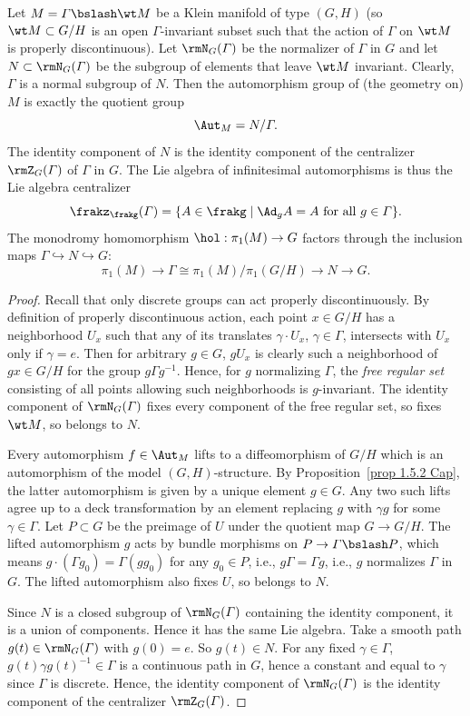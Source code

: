 \begin{thm}
    Let $M=\varGamma\bslash \wt M$ be a Klein manifold of type $(G,H)$ (so $\wt M\subset G\slash H$ is an open $\varGamma$-invariant subset such that the action of $\varGamma$ on $\wt M$ is properly discontinuous). Let $\rmN_G(\varGamma)$ be the normalizer of $\varGamma$ in $G$ and let $N\subset \rmN_G(\varGamma)$ be the subgroup of elements that leave $\wt M$ invariant. Clearly, $\varGamma$ is a normal subgroup of $N$. Then the automorphism group of (the geometry on) $M$ is exactly the quotient group
    \[\Aut_M=N\slash \varGamma.\]
    The identity component of $N$ is the identity component of the centralizer $\rmZ_G(\varGamma)$ of $\varGamma$ in $G$. The Lie algebra of infinitesimal automorphisms is thus the Lie algebra centralizer 
    \[\frakz_\frakg(\varGamma)=\{A\in\frakg\mid \Ad_g A=A\text{ for all }g\in\varGamma\}.\]
    The monodromy homomorphism $\hol:\pi_1(M)\to G$ factors through the inclusion maps $\varGamma\hookrightarrow N\hookrightarrow G$:
    \[\pi_1(M)\to \varGamma\cong \pi_1(M)\slash \pi_1(G\slash H)\to N\to G.\] 
\end{thm}
\begin{proof}
    Recall that only discrete groups can act properly discontinuously. By definition of properly discontinuous action, each point $x\in G\slash H$ has a neighborhood $U_x$ such that any of its translates $\gamma\cdot U_x$, $\gamma\in\varGamma$, intersects with $U_x$ only if $\gamma=e$. Then for arbitrary $g\in G$, $gU_x$ is clearly such a neighborhood of $gx\in G\slash H$ for the group $g\varGamma g^{-1}$. Hence, for $g$ normalizing $\varGamma$, the \emph{free regular set}  consisting of all points allowing such neighborhoods is $g$-invariant. The identity component of $\rmN_G(\varGamma)$ fixes every component of the free regular set, so fixes $\wt M$, so belongs to $N$. 

    Every automorphism $f\in \Aut_M$ lifts to a diffeomorphism of $G\slash H$ which is an automorphism of the model $(G,H)$-structure. By Proposition~\ref{prop 1.5.2 Cap}, the latter automorphism is given by a unique element $g\in G$. Any two such lifts agree up to a deck transformation by an element replacing $g$ with $\gamma g$ for some $\gamma\in\varGamma$. Let $P\subset G$ be the preimage of $U$ under the quotient map $G\to G\slash H$. The lifted automorphism $g$ acts by bundle morphisms on $P\to \varGamma\bslash P$, which means $g\cdot (\varGamma g_0)=\varGamma (gg_0)$ for any $g_0\in P$, i.e., $g\varGamma=\varGamma g$, i.e., $g$ normalizes $\varGamma$ in $G$. The lifted automorphism also fixes $U$, so belongs to $N$.

    Since $N$ is a closed subgroup of $\rmN_G(\varGamma)$ containing the identity component, it is a union of components. Hence it has the same Lie algebra. Take a smooth path $g(t)\in \rmN_G(\varGamma)$ with $g(0)=e$. So $g(t)\in N$. For any fixed $\gamma\in\varGamma$, $g(t)\gamma g(t)^{-1}\in\varGamma$ is a continuous path in $G$, hence a constant and equal to $\gamma$ since $\varGamma$ is discrete. Hence, the identity component of $\rmN_G(\varGamma)$ is the identity component of the centralizer $\rmZ_G(\varGamma)$.
\end{proof}

